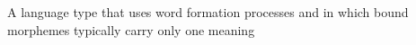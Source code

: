 A language type that uses word formation processes and in which bound morphemes typically carry only one meaning
